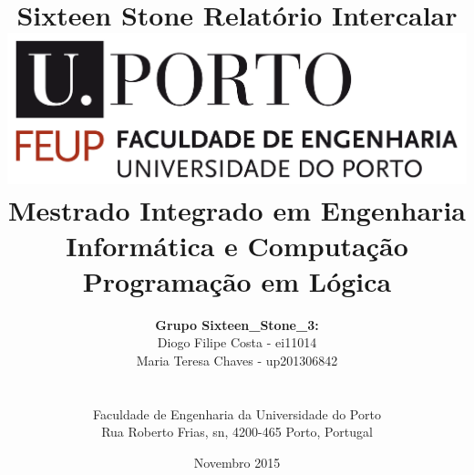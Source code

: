 \documentclass[a4paper]{article}
\begin{document}
\setlength{\textwidth}{16cm}
\setlength{\textheight}{22cm}

\title{\Huge\textbf{Sixteen Stone}\linebreak\linebreak\linebreak
\Large\textbf{Relatório Intercalar}\linebreak\linebreak
\linebreak\linebreak
\includegraphics[scale=0.1]{images/feup-logo.png}\linebreak\linebreak
\linebreak\linebreak
\Large{Mestrado Integrado em Engenharia Informática e Computação} \linebreak\linebreak
\Large{Programação em Lógica}\linebreak
}

\author{\textbf{Grupo Sixteen\_Stone\_3:}\\
Diogo Filipe Costa - ei11014 \\
Maria Teresa Chaves - up201306842 \\
\linebreak\linebreak \\
 \\ Faculdade de Engenharia da Universidade do Porto \\ Rua Roberto Frias, s\/n, 4200-465 Porto, Portugal \linebreak\linebreak\linebreak
\linebreak\linebreak\vspace{1cm}}
\date{Novembro 2015}

\maketitle
\thispagestyle{empty}
\end{document}
